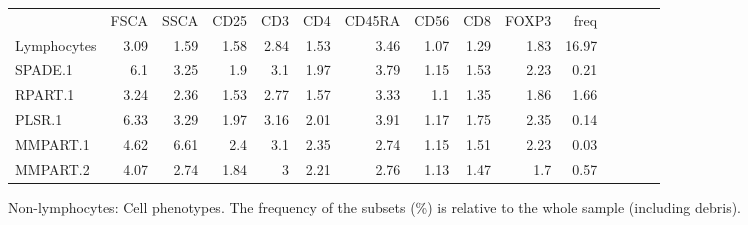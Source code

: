 \begin{table}[h]\footnotesize
\centering
\begin{tabular}{lrrrrrrrrrrrrrr}
\rowcolor{Gray} 
            & FSCA & SSCA & CD25 & CD3  & CD4  & CD45RA & CD56 & CD8  & FOXP3 & freq \\
Lymphocytes & 3.09 & 1.59 & 1.58 & 2.84 & 1.53 & 3.46   & 1.07 & 1.29 & 1.83  & 16.97 \\
SPADE.1     & 6.1  & 3.25 & 1.9  & 3.1  & 1.97 & 3.79   & 1.15 & 1.53 & 2.23  & 0.21 \\
RPART.1     & 3.24 & 2.36 & 1.53 & 2.77 & 1.57 & 3.33   & 1.1  & 1.35 & 1.86  & 1.66 \\
PLSR.1      & 6.33 & 3.29 & 1.97 & 3.16 & 2.01 & 3.91   & 1.17 & 1.75 & 2.35  & 0.14 \\
MMPART.1    & 4.62 & 6.61 & 2.4  & 3.1  & 2.35 & 2.74   & 1.15 & 1.51 & 2.23  & 0.03 \\
MMPART.2    & 4.07 & 2.74 & 1.84 & 3    & 2.21 & 2.76   & 1.13 & 1.47 & 1.7   & 0.57 \\
\end{tabular}
{ Non-lymphocytes: Cell phenotypes. }
{
    The frequency of the subsets (\%) is relative to the whole sample (including debris).
}
\end{table}


